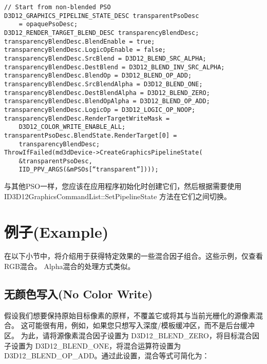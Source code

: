 \begin{lstlisting}
// Start from non-blended PSO
D3D12_GRAPHICS_PIPELINE_STATE_DESC transparentPsoDesc
    = opaquePsoDesc;
D3D12_RENDER_TARGET_BLEND_DESC transparencyBlendDesc;
transparencyBlendDesc.BlendEnable = true;
transparencyBlendDesc.LogicOpEnable = false;
transparencyBlendDesc.SrcBlend = D3D12_BLEND_SRC_ALPHA;
transparencyBlendDesc.DestBlend = D3D12_BLEND_INV_SRC_ALPHA;
transparencyBlendDesc.BlendOp = D3D12_BLEND_OP_ADD;
transparencyBlendDesc.SrcBlendAlpha = D3D12_BLEND_ONE;
transparencyBlendDesc.DestBlendAlpha = D3D12_BLEND_ZERO;
transparencyBlendDesc.BlendOpAlpha = D3D12_BLEND_OP_ADD;
transparencyBlendDesc.LogicOp = D3D12_LOGIC_OP_NOOP;
transparencyBlendDesc.RenderTargetWriteMask = 
    D3D12_COLOR_WRITE_ENABLE_ALL;
transparentPsoDesc.BlendState.RenderTarget[0] = 
    transparencyBlendDesc;
ThrowIfFailed(md3dDevice->CreateGraphicsPipelineState(
    &transparentPsoDesc,
    IID_PPV_ARGS(&mPSOs[“transparent”])));
\end{lstlisting}

\begin{flushleft}
与其他PSO一样，您应该在应用程序初始化时创建它们，然后根据需要使用 ID3D12GraphicsCommandList::SetPipelineState 方法在它们之间切换。\\
\end{flushleft}

\section{例子(Example)}
\begin{flushleft}
在以下小节中，将介绍用于获得特定效果的一些混合因子组合。这些示例，仅查看RGB混合。 Alpha混合的处理方式类似。\\
\end{flushleft}

\subsection{无颜色写入(No Color Write)}
\begin{flushleft}
假设我们想要保持原始目标像素的原样，不覆盖它或将其与当前光栅化的源像素混合。 这可能很有用，例如，如果您只想写入深度/模板缓冲区，而不是后台缓冲区。 为此，请将源像素混合因子设置为 D3D12\_BLEND\_ZERO，将目标混合因子设置为 D3D12\_BLEND\_ONE，将混合运算符设置为 D3D12\_BLEND\_OP\_ADD。通过此设置，混合等式可简化为：\\
\end{flushleft}

